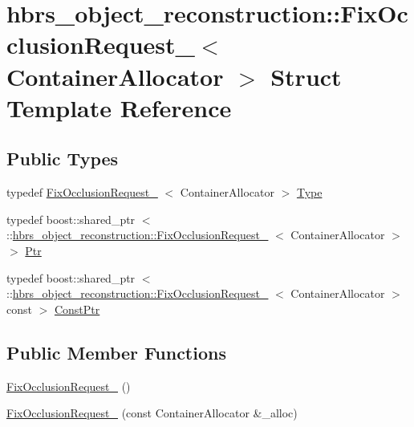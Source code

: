 \hypertarget{structhbrs__object__reconstruction_1_1_fix_occlusion_request__}{\section{hbrs\-\_\-object\-\_\-reconstruction\-:\-:\-Fix\-Occlusion\-Request\-\_\-$<$ \-Container\-Allocator $>$ \-Struct \-Template \-Reference}
\label{structhbrs__object__reconstruction_1_1_fix_occlusion_request__}
}
\subsection*{\-Public \-Types}
\begin{DoxyCompactItemize}
\item 
typedef \hyperlink{structhbrs__object__reconstruction_1_1_fix_occlusion_request__}{\-Fix\-Occlusion\-Request\-\_\-}\*
$<$ \-Container\-Allocator $>$ \hyperlink{structhbrs__object__reconstruction_1_1_fix_occlusion_request___a02fb01d00547db859af176c095556051}{\-Type}
\item 
typedef boost\-::shared\-\_\-ptr\*
$<$ \-::\hyperlink{structhbrs__object__reconstruction_1_1_fix_occlusion_request__}{hbrs\-\_\-object\-\_\-reconstruction\-::\-Fix\-Occlusion\-Request\-\_\-}\*
$<$ \-Container\-Allocator $>$ $>$ \hyperlink{structhbrs__object__reconstruction_1_1_fix_occlusion_request___ab4a27a224f264c01e0c7ffc9e517ccaa}{\-Ptr}
\item 
typedef boost\-::shared\-\_\-ptr\*
$<$ \-::\hyperlink{structhbrs__object__reconstruction_1_1_fix_occlusion_request__}{hbrs\-\_\-object\-\_\-reconstruction\-::\-Fix\-Occlusion\-Request\-\_\-}\*
$<$ \-Container\-Allocator $>$ const  $>$ \hyperlink{structhbrs__object__reconstruction_1_1_fix_occlusion_request___aa0461a2e3d45a8d9e5bb0fa2bd58dcfd}{\-Const\-Ptr}
\end{DoxyCompactItemize}
\subsection*{\-Public \-Member \-Functions}
\begin{DoxyCompactItemize}
\item 
\hyperlink{structhbrs__object__reconstruction_1_1_fix_occlusion_request___acdbaf3d5997c3d2aec1bbf37730fe6b2}{\-Fix\-Occlusion\-Request\-\_\-} ()
\item 
\hyperlink{structhbrs__object__reconstruction_1_1_fix_occlusion_request___a808fd197168bc3b6b9ce3f96d9140d97}{\-Fix\-Occlusion\-Request\-\_\-} (const \-Container\-Allocator \&\-\_\-alloc)
\end{DoxyCompactItemize}
